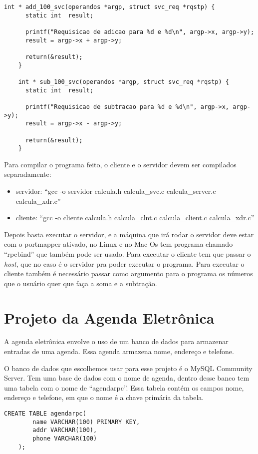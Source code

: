\documentclass[12pt,a4paper]{article}
\begin{document}
\begin{lstlisting}[caption=calcula\_server.c]
	int * add_100_svc(operandos *argp, struct svc_req *rqstp) {
	  static int  result;

	  printf("Requisicao de adicao para %d e %d\n", argp->x, argp->y);
	  result = argp->x + argp->y;
  
	  return(&result);
	}

	int * sub_100_svc(operandos *argp, struct svc_req *rqstp) {
	  static int  result;
  
	  printf("Requisicao de subtracao para %d e %d\n", argp->x, argp->y);
	  result = argp->x - argp->y;
  
	  return(&result);
	}
\end{lstlisting}

Para compilar o programa feito, o cliente e o servidor devem ser compilados separadamente:
\begin{itemize}
	\item servidor: ``gcc -o servidor calcula.h calcula\_svc.c calcula\_server.c calcula\_xdr.c''
	\item cliente: ``gcc -o cliente calcula.h calcula\_clnt.c calcula\_client.c calcula\_xdr.c''
\end{itemize}

Depois basta executar o servidor, e a máquina que irá rodar o servidor deve estar com o portmapper
ativado, no Linux e no Mac Os tem programa chamado ``rpcbind'' que também pode ser usado. Para executar
o cliente tem que passar o \textit{host}, que no caso é o servidor pra poder executar o programa.
Para executar o cliente também é necessário passar como argumento para o programa os números
que o usuário quer que faça a soma e a subtração.

\section{Projeto da Agenda Eletrônica}

A agenda eletrônica envolve o uso de um banco de dados para armazenar entradas de
uma agenda. Essa agenda armazena nome, endereço e telefone.

O banco de dados que escolhemos usar para esse projeto é o MySQL Community Server\cite{mysql}.
Tem uma base de dados com o nome de agenda, dentro desse banco tem uma tabela com o nome de
``agendarpc''. Essa tabela contém os campos nome, endereço e telefone, em que o nome é a chave
primária da tabela.

\lstset{language=SQL}
\begin{lstlisting}[caption=Comando no MySQL usado para criar a tabela]
	CREATE TABLE agendarpc(
		name VARCHAR(100) PRIMARY KEY,
		addr VARCHAR(100),
		phone VARCHAR(100)
	);
\end{lstlisting}
\end{document}
